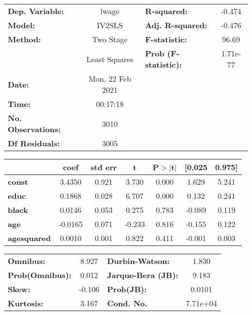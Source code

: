 \begin{center}
\begin{tabular}{lclc}
\toprule
\textbf{Dep. Variable:}    &      lwage       & \textbf{  R-squared:         } &    -0.474   \\
\textbf{Model:}            &      IV2SLS      & \textbf{  Adj. R-squared:    } &    -0.476   \\
\textbf{Method:}           &    Two Stage     & \textbf{  F-statistic:       } &     96.69   \\
\textbf{}                  &  Least Squares   & \textbf{  Prob (F-statistic):} &  1.71e-77   \\
\textbf{Date:}             & Mon, 22 Feb 2021 & \textbf{                     } &             \\
\textbf{Time:}             &     00:17:18     & \textbf{                     } &             \\
\textbf{No. Observations:} &        3010      & \textbf{                     } &             \\
\textbf{Df Residuals:}     &        3005      & \textbf{                     } &             \\
\bottomrule
\end{tabular}
\begin{tabular}{lcccccc}
                    & \textbf{coef} & \textbf{std err} & \textbf{t} & \textbf{P$> |$t$|$} & \textbf{[0.025} & \textbf{0.975]}  \\
\midrule
\textbf{const}      &       3.4350  &        0.921     &     3.730  &         0.000        &        1.629    &        5.241     \\
\textbf{educ}       &       0.1868  &        0.028     &     6.707  &         0.000        &        0.132    &        0.241     \\
\textbf{black}      &       0.0146  &        0.053     &     0.275  &         0.783        &       -0.089    &        0.119     \\
\textbf{age}        &      -0.0165  &        0.071     &    -0.233  &         0.816        &       -0.155    &        0.122     \\
\textbf{agesquared} &       0.0010  &        0.001     &     0.822  &         0.411        &       -0.001    &        0.003     \\
\bottomrule
\end{tabular}
\begin{tabular}{lclc}
\textbf{Omnibus:}       &  8.927 & \textbf{  Durbin-Watson:     } &    1.830  \\
\textbf{Prob(Omnibus):} &  0.012 & \textbf{  Jarque-Bera (JB):  } &    9.183  \\
\textbf{Skew:}          & -0.106 & \textbf{  Prob(JB):          } &   0.0101  \\
\textbf{Kurtosis:}      &  3.167 & \textbf{  Cond. No.          } & 7.71e+04  \\
\bottomrule
\end{tabular}
\end{center}
